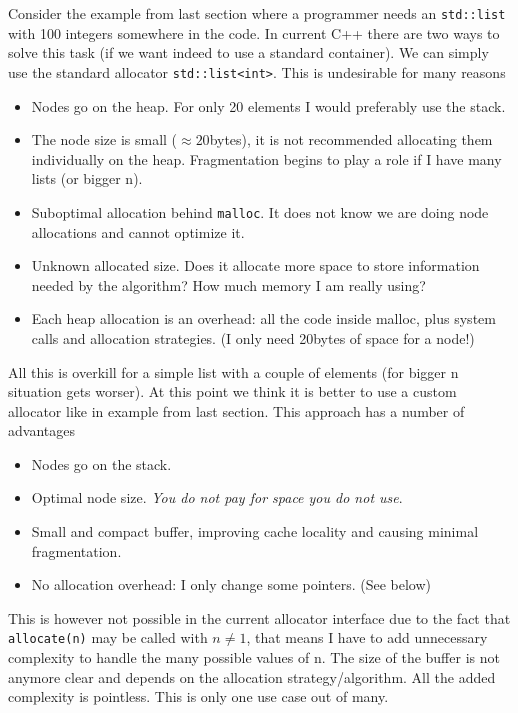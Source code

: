\documentclass[11pt]{article}
\begin{document}
Consider the example from last section where a programmer needs an
\texttt{std::list} with 100 integers somewhere in the code. In current C++
there are two ways to solve this task (if we want indeed to use a
standard container). We can simply use the standard allocator
\texttt{std::list<int>}.  This is undesirable for many reasons
\begin{itemize}
\item Nodes go on the heap. For only 20 elements I would preferably
use the stack.
\item The node size is small ($\approx 20$bytes), it is not recommended
allocating them individually on the heap. Fragmentation begins to play a role
if I have many lists (or bigger n).
\item Suboptimal allocation behind \texttt{malloc}. It does not
know we are doing node allocations and cannot optimize it.
\item Unknown allocated size. Does it allocate more space to store information
needed by the algorithm? How much memory I am really using?
\item  Each heap allocation is an overhead: all the code inside malloc, plus
system calls and allocation strategies. (I only need 20bytes of space for a
node!)
\end{itemize}

All this is overkill for a simple list with a couple of elements
(for bigger n situation gets worser). At this point we think it is
better to use a custom allocator like in example from last section.
This approach has a number of advantages
\begin{itemize}
\item Nodes go on the stack.
\item Optimal node size. {\it You do not pay for space you do not use}.
\item Small and compact buffer, improving cache locality and causing
minimal fragmentation.
\item No allocation overhead: I only change some pointers. (See below)
\end{itemize}

This is however not possible in the current allocator interface
due to the fact that \texttt{allocate(n)} may be called with $n \ne 1$,
that means I have to add unnecessary complexity to handle the many possible
values of n. The size of the buffer is not anymore clear and depends on the
allocation strategy/algorithm. All the added complexity is pointless. This is
only one use case out of many.
\end{document}
